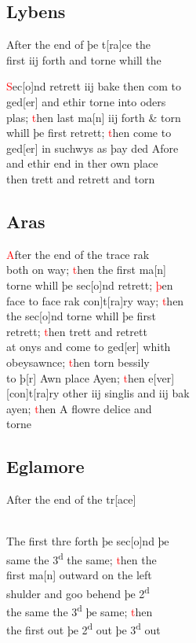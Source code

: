 \documentclass[12pt,letter]{article} %
\newcommand{\red}[1]{\textcolor{red}{#1}}
\newcommand{\srcpg}[1]{
    \noindent{
        \color{Gray}{\rule[0.5ex]{\linewidth}{1pt}~#1} 
    
    }
}
\begin{document}
\subsection{Lybens}
After the end of þe t{[}ra{]}ce the\\
first iij forth and torne whill the
\srcpg{64}
\red{S}ec{[}o{]}nd retrett iij bake then com to\\
ged{[}er{]} and ethir torne into oders\\
plas; \red{t}hen last ma{[}n{]} iij forth \& torn\\
whill þe first retrett; \red{t}hen come to\\
ged{[}er{]} in suchwys as þay ded Afore\\
and ethir end in ther own place\\
then trett and retrett and torn

\subsection{Aras}
\red{A}fter the end of the trace rak\\
both on way; \red{t}hen the first ma{[}n{]}\\
torne whill þe sec{[}o{]}nd retrett; \red{þ}en\\
face to face rak \marginnote{2}{[}con{]}t{[}ra{]}ry way; \red{t}hen\\
the sec{[}o{]}nd torne whill þe first\\
retrett; \red{t}hen trett and retrett\\
at onys and come to ged{[}er{]} whith\\
obeysawnce; \red{t}hen torn bessily\\
to þ{[}r{]} Awn place Ayen; \red{t}hen e{[}ver{]}\\
{[}con{]}t{[}ra{]}ry other iij singlis and iij bak\\
ayen; \red{t}hen A flowre delice and\\
torne

\subsection{Eglamore}
After the end of the tr{[}ace{]} 
\\ \ 
\srcpg{65}
The first thre forth þe sec{[}o{]}nd þe\\
same the 3\textsuperscript{d} the same; \red{t}hen the\\
first ma{[}n{]} outward on the left\\
shulder and goo behend þe 2\textsuperscript{d}\\
the same the 3\textsuperscript{d} þe same; \red{t}hen\\
the first out þe 2\textsuperscript{d} out þe 3\textsuperscript{d} out
\end{document}
